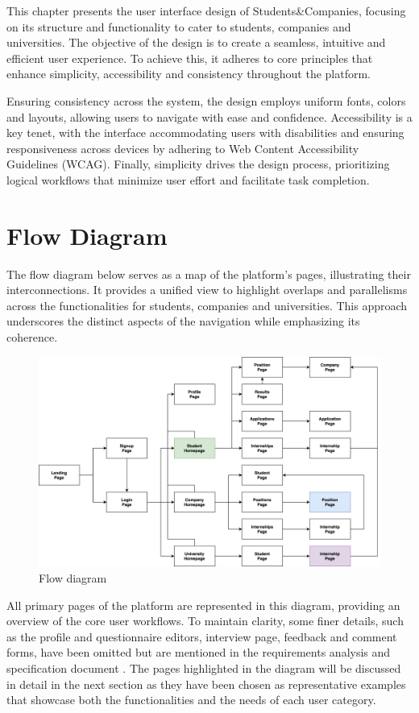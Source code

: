 This chapter presents the user interface design of Students\&Companies, focusing on its structure and functionality to cater to students, companies and universities.
The objective of the design is to create a seamless, intuitive and efficient user experience.
To achieve this, it adheres to core principles that enhance simplicity, accessibility and consistency throughout the platform.

Ensuring consistency across the system, the design employs uniform fonts, colors and layouts, allowing users to navigate with ease and confidence.
Accessibility is a key tenet, with the interface accommodating users with disabilities and ensuring responsiveness across devices by adhering to Web Content Accessibility Guidelines (WCAG).
Finally, simplicity drives the design process, prioritizing logical workflows that minimize user effort and facilitate task completion.

\section{Flow Diagram}
The flow diagram below serves as a map of the platform's pages, illustrating their interconnections.
It provides a unified view to highlight overlaps and parallelisms across the functionalities for students, companies and universities.
This approach underscores the distinct aspects of the navigation while emphasizing its coherence.

\begin{figure}[h]
    \centering
    \includegraphics[width=16cm]{images/flow-diagram.png}
    \caption{Flow diagram}
\end{figure}

All primary pages of the platform are represented in this diagram, providing an overview of the core user workflows.
To maintain clarity, some finer details, such as the profile and questionnaire editors, interview page, feedback and comment forms, have been omitted but are mentioned in the requirements analysis and specification document \cite{carraracurrodossi2024}.
The pages highlighted in the diagram will be discussed in detail in the next section as they have been chosen as representative examples that showcase both the functionalities and the needs of each user category.

